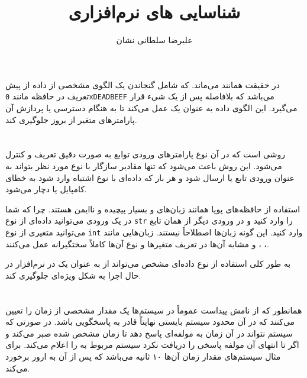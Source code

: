 \documentclass[a4paper]{article}
\title{شناسایی \lr{Fault}های نرم‌افزاری}
\author{علیرضا سلطانی نشان}
\begin{document}
\maketitle

\section{}

در حقیقت همانند  می‌ماند. که شامل گنجاندن یک الگوی مشخصی از داده از
پیش تعریف در حافظه مانند \texttt{0xDEADBEEF} می‌باشد که بلافاصله پس از
 یک شیء قرار می‌گیرد. این الگوی داده به عنوان یک
 عمل می‌کند تا به هنگام دسترسی یا پردازش آن پارامتر‌های متغیر از
بروز  جلوگیری کند.

\section{}

روشی است که در آن نوع پارامتر‌های ورودی توابع به صورت دقیق تعریف و کنترل می‌شود.
این روش باعث می‌شود که تنها مقادیر سازگار با نوع مورد نظر بتواند به عنوان ورودی
تابع یا  ارسال شود و هر بار که داده‌ای با نوع اشتباه وارد شود به خطای
کامپایل یا  دچار می‌شود.

استفاده از حافظه‌های پویا همانند زبان‌های  و  بسیار
پیچیده و ناایمن هستند. چرا که شما در یک ورودی می‌توانید داده‌ای از نوع
\texttt{str} را وارد کنید و در ورودی دیگر از همان تابع می‌توانید متغیری از نوع
\texttt{int} وارد کنید. این گونه زبان‌ها اصطلاحاً  نیستند.
زبان‌هایی مانند ، ،  و مشابه آن‌ها در تعریف متغیر‌ها و
نوع آن‌ها کاملاً سختگیرانه عمل می‌کنند.

به طور کلی استفاده از نوع داده‌ای مشخص می‌تواند از  به عنوان یک
 در نرم‌افزار در حال اجرا به شکل ویژه‌ای جلوگیری کند.

\section{}

همانطور که از نامش پیداست عموماً در سیستم‌ها یک مقدار مشخصی از زمان را تعیین
می‌کنند که در آن محدود سیستم بایستی نهایتاً قادر به پاسخگویی باشد. در صورتی که
سیستم نتواند در آن زمان به مولفه‌ای پاسخ دهد تا زمان مشخص شده صبر می‌کند و اگر
تا انتهای آن مولفه پاسخی را دریافت نکرد سیستم  مربوط به
 را اعلام می‌کند. برای مثال سیستم‌های  مقدار زمان
 آن‌ها ۱۰ ثانیه می‌باشد که پس از آن به ارور  برخورد
می‌کند.
\end{document}
